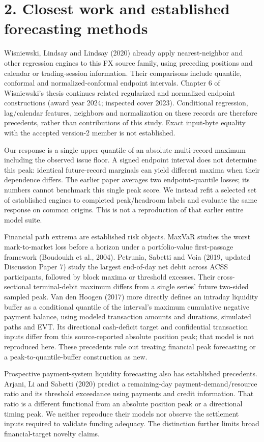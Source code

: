 \documentclass[10pt,a4paper]{article}
\begin{document}
\section*{2. Closest work and established forecasting methods}
Wisniewski, Lindsay and Lindsay (2020) already apply nearest-neighbor and other regression engines to this FX source family, using preceding positions and calendar or trading-session information. Their comparisons include quantile, conformal and normalized-conformal endpoint intervals. Chapter 6 of Wisniewski's thesis continues related regularized and normalized endpoint constructions (award year 2024; inspected cover 2023). Conditional regression, lag/calendar features, neighbors and normalization on these records are therefore precedents, rather than contributions of this study. Exact input-byte equality with the accepted version-2 member is not established.

Our response is a single upper quantile of an absolute multi-record maximum including the observed issue floor. A signed endpoint interval does not determine this peak: identical future-record marginals can yield different maxima when their dependence differs. The earlier paper averages two endpoint-quantile losses; its numbers cannot benchmark this single peak score. We instead refit a selected set of established engines to completed peak/headroom labels and evaluate the same response on common origins. This is not a reproduction of that earlier entire model suite.

Financial path extrema are established risk objects. MaxVaR studies the worst mark-to-market loss before a horizon under a portfolio-value first-passage framework (Boudoukh et al., 2004). Petrunia, Sabetti and Voia (2019, updated Discussion Paper 7) study the largest end-of-day net debit across ACSS participants, followed by block maxima or threshold excesses. Their cross-sectional terminal-debit maximum differs from a single series' future two-sided sampled peak. Van den Hoogen (2017) more directly defines an intraday liquidity buffer as a conditional quantile of the interval's maximum cumulative negative payment balance, using modeled transaction amounts and durations, simulated paths and EVT. Its directional cash-deficit target and confidential transaction inputs differ from this source-reported absolute position peak; that model is not reproduced here. These precedents rule out treating financial peak forecasting or a peak-to-quantile-buffer construction as new.

Prospective payment-system liquidity forecasting also has established precedents. Arjani, Li and Sabetti (2020) predict a remaining-day payment-demand/resource ratio and its threshold exceedance using payments and credit information. That ratio is a different functional from an absolute position peak or a directional timing peak. We neither reproduce their models nor observe the settlement inputs required to validate funding adequacy. The distinction further limits broad financial-target novelty claims.
\end{document}
